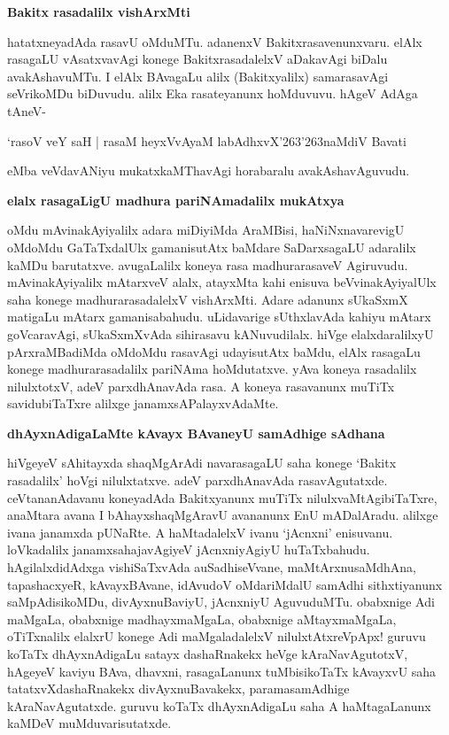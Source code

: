 {\bigskip
\noindent
{\large\bf Bakitx rasadalilx vishArxMti}}\label{page231}
\medskip

\noindent
hatatxneyadAda rasavU oMduMTu. adanenxV Bakitxrasavenunxvaru. elAlx rasagaLU vAsatxvavAgi konege BakitxrasadalelxV aDakavAgi biDalu avakAshavuMTu. I elAlx BAvagaLu alilx (Bakitxyalilx) samarasavAgi seVrikoMDu biDuvudu. alilx Eka rasateyanunx hoMduvuvu. hAgeV AdAga tAneV-

\begin{shloka}
`rasoV veY saH | rasaM heyxVvAyaM labAdhxvX\char'263\char'263naMdiV Bavati\label{231}
\end{shloka}

\noindent
eMba veVdavANiyu mukatxkaMThavAgi horabaralu avakAshavAguvudu.

{\bigskip
\noindent
{\large\bf elalx rasagaLigU madhura pariNAmadalilx mukAtxya}}\label{page231}
\medskip

\noindent
oMdu mAvinakAyiyalilx adara miDiyiMda AraMBisi, haNiNxnavarevigU oMdoMdu GaTaTx\-dalUlx gamanisutAtx baMdare SaDarxsagaLU adaralilx kaMDu barutatxve. avugaLalilx koneya rasa madhura\-rasaveV Agiruvudu. mAvinakAyiyalilx mAtarxveV alalx, atayxMta kahi enisuva beVvinakAyiyalUlx saha konege\- madhurarasadalelxV vishArxMti. Adare adanunx sUkaSxmX matigaLu mAtarx gamanisabahudu. uLidavarige sUthxla\-vAda kahiyu mAtarx goVcaravAgi, sUkaSxmXvAda sihirasavu kANuvudilalx. hiVge elalxdaralilxyU pArxraMBa\-diMda oMdoMdu rasavAgi udayisutAtx baMdu, elAlx rasagaLu konege madhurarasadalilx pari\-NAma hoMdutatxve. yAva koneya rasadalilx nilulxtotxV, adeV parxdhAnavAda rasa. A koneya rasavanunx muTiTx savidubiTaTxre alilxge janamxsAPalayxvAdaMte.

{\bigskip
\noindent
{\large\bf dhAyxnAdigaLaMte kAvayx BAvaneyU samAdhige sAdhana}}\label{231}
\medskip

\noindent
hiVgeyeV sAhitayxda shaqMgArAdi navarasagaLU saha konege `Bakitx rasadalilx' hoVgi nilulxtatxve. adeV parxdhAnavAda rasavAgutatxde. ceVtananAdavanu koneyadAda Bakitxyanunx muTiTx nilulxvaMtAgibiTaTxre, anaM\-tara avana I bAhayxshaqMgAravU avananunx EnU mADalAradu. alilxge ivana janamxda pUNaRte. A haMtadalelxV ivanu `jAcnxni' enisuvanu. loVkadalilx janamxsahajavAgiyeV jAcnxniyAgiyU huTaTx\-bahudu. hAgilalxdidAdxga vishiSaTxvAda auSadhiseVvane, maMtArxnusaMdhAna, tapashacxyeR, kAvayxBAvane, idA\-vudoV oMdariMdalU samAdhi sithxtiyanunx saMpAdisikoMDu, divAyxnuBaviyU, jAcnxniyU Aguvu\-duMTu. obabxnige Adi maMgaLa, obabxnige madhayxmaMgaLa, obabxnige aMtayxmaMgaLa, oTiTxnalilx elalxrU konege Adi\- maMgaladalelxV nilulxtAtxreVpApx! guruvu koTaTx dhAyxnAdigaLu satayx dashaRnakekx heVge kAraNavAgutotxV, hAge\-yeV kaviyu BAva, dhavxni, rasagaLanunx tuMbisikoTaTx kAvayxvU saha tatatxvXdashaRnakekx divAyxnuBavakekx, parama\-samA\-dhige kAraNavAgutatxde. guruvu koTaTx dhAyxnAdigaLu saha A haMtagaLanunx kaMDeV muMduvarisutatxde.

